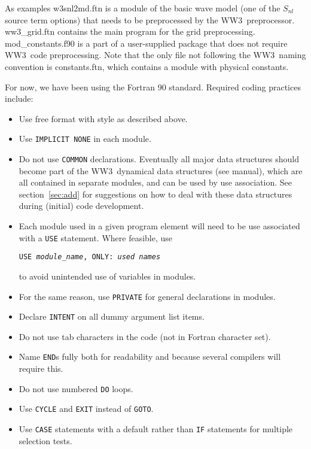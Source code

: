 \documentclass[12pt]{article}
\newcommand{\ws}{WW3}
\newcommand{\file}{\sf}
\newcommand{\code}{\tt}
\newcounter{mylistno}
\begin{document}
\begin{list}{)}{ \rightmargin 8mm
                                \leftmargin 10mm }
      As examples {\file w3snl2md.ftn} is a module of the basic wave model
      (one of the $S_{nl}$ source term options) that needs to be preprocessed
      by the \ws\ preprocessor. {\file ww3\_grid.ftn} contains the main
      program for the grid preprocessing. {\file mod\_constants.f90} is a part
      of a user-supplied package that does not require \ws\ code
      preprocessing.  Note that the only file not following the \ws\ naming
      convention is {\file constants.ftn}, which contains a module with
      physical constants.

\item For now, we have been using the Fortran 90 standard. Required coding
      practices include:

\begin{itemize}
\item Use free format with style as described above.
\item Use {\code IMPLICIT NONE} in each module.
\item Do not use {\code COMMON} declarations. Eventually all major data
      structures should become part of the \ws\ dynamical data structures (see
      manual), which are all contained in separate modules, and can be used by
      use association. See section~\ref{sec:add} for suggestions on how to
      deal with these data structures during (initial) code development.
\item Each module used in a given program element will need to be use
      associated with a {\code USE} statement. Where feasible, use

      \centerline {{\code USE {\it module\_name}, ONLY: {\it used names}}}

      to avoid unintended use of variables in modules.
\item For the same reason, use {\code PRIVATE} for general declarations in
      modules. 
\item Declare {\code INTENT} on all dummy argument list items.
\item Do not use tab characters in the code (not in Fortran character set).
\item Name {\code END}s fully both for readability and because several
      compilers will require this.
\item Do not use numbered {\code DO} loops.
\item Use {\code CYCLE} and {\code EXIT} instead of {\code GOTO}.
\item Use {\code CASE} statements with a default rather than {\code IF}
      statements for multiple selection tests.


\end{itemize}
\end{list}
\end{document}
